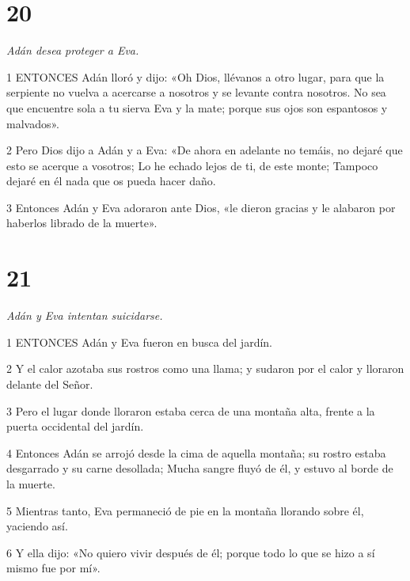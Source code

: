 \chapter{20}

\par \textit{Adán desea proteger a Eva.}

\par 1 ENTONCES Adán lloró y dijo: «Oh Dios, llévanos a otro lugar, para que la serpiente no vuelva a acercarse a nosotros y se levante contra nosotros. No sea que encuentre sola a tu sierva Eva y la mate; porque sus ojos son espantosos y malvados».

\par 2 Pero Dios dijo a Adán y a Eva: «De ahora en adelante no temáis, no dejaré que esto se acerque a vosotros; Lo he echado lejos de ti, de este monte; Tampoco dejaré en él nada que os pueda hacer daño.

\par 3 Entonces Adán y Eva adoraron ante Dios, «le dieron gracias y le alabaron por haberlos librado de la muerte».

\chapter{21}

\par \textit{Adán y Eva intentan suicidarse.}

\par 1 ENTONCES Adán y Eva fueron en busca del jardín.

\par 2 Y el calor azotaba sus rostros como una llama; y sudaron por el calor y lloraron delante del Señor.

\par 3 Pero el lugar donde lloraron estaba cerca de una montaña alta, frente a la puerta occidental del jardín.

\par 4 Entonces Adán se arrojó desde la cima de aquella montaña; su rostro estaba desgarrado y su carne desollada; Mucha sangre fluyó de él, y estuvo al borde de la muerte.

\par 5 Mientras tanto, Eva permaneció de pie en la montaña llorando sobre él, yaciendo así.

\par 6 Y ella dijo: «No quiero vivir después de él; porque todo lo que se hizo a sí mismo fue por mí».


